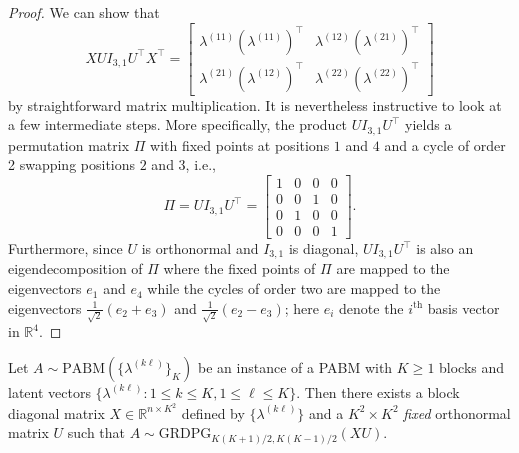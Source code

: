 \documentclass[12pt]{article}
\begin{document}
\begin{proof}
  We can show that
\[X U I_{3, 1} U^\top X^\top =
\begin{bmatrix}
  \lambda^{(11)} (\lambda^{(11)})^\top & \lambda^{(12)} (\lambda^{(21)})^\top \\
  \lambda^{(21)} (\lambda^{(12)})^\top & \lambda^{(22)} (\lambda^{(22)})^\top
\end{bmatrix} \]
by straightforward matrix multiplication. It is nevertheless
instructive to look at a few intermediate steps. More specifically,
the product $U I_{3, 1} U^\top$ yields a permutation matrix $\Pi$
with fixed points at positions $1$ and $4$ and a cycle of order 2 swapping
positions $2$ and $3$, i.e., 
$$\Pi = U I_{3, 1} U^\top = \begin{bmatrix} 1 & 0 & 0 & 0 \\
  0 & 0 & 1 & 0 \\
  0 & 1 & 0 & 0 \\
  0 & 0 & 0 & 1
\end{bmatrix}.$$
Furthermore, since $U$ is orthonormal and $I_{3, 1}$ is diagonal, $U I_{3, 1} U^\top$
is also an eigendecomposition of $\Pi$ where the fixed
points of $\Pi$ are mapped to the eigenvectors $e_1$ and $e_4$
while the cycles of order two are mapped to the eigenvectors  
$\tfrac{1}{\sqrt{2}}(e_{2} + e_3)$ and $\tfrac{1}{\sqrt{2}}(e_{2} -
e_3)$; here $e_i$ denote the $i^\mathrm{th}$ basis vector in $\mathbb{R}^{4}$.
\end{proof}

\begin{theorem}[Generalization to $K > 2$]
\label{theorem2}
Let $A \sim \mathrm{PABM}(\{\lambda^{(k \ell)}\}_K)$ be an instance of a
PABM with $K \geq 1$ blocks and latent vectors $\{\lambda^{(k \ell)}
\colon 1 \leq k \leq K, 1 \leq \ell \leq K\}$. 
Then there exists a block diagonal matrix
$X \in \mathbb{R}^{n \times K^2}$ defined by $\{\lambda^{(k \ell)}\}$ and a 
$K^2 \times K^2$ {\em fixed} orthonormal matrix $U$ such 
that $A \sim \mathrm{GRDPG}_{K (K+1) / 2, K (K-1) / 2}(XU)$.
\end{theorem}
\end{document}
